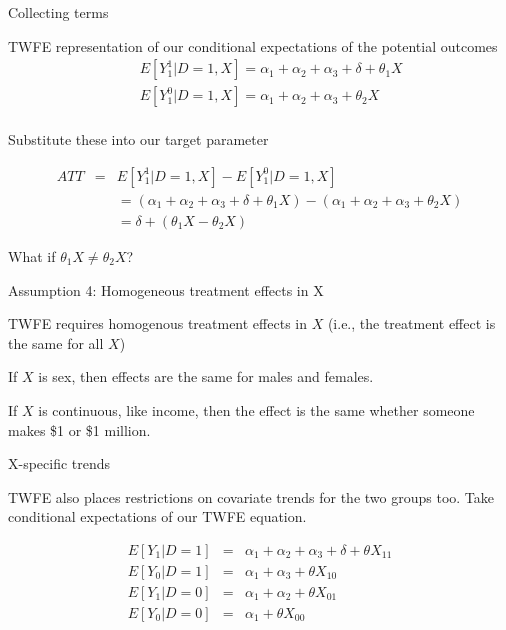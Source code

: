 \documentclass{beamer}
\begin{document}
\begin{frame}{Collecting terms}

TWFE representation of our conditional expectations of the potential outcomes
\begin{eqnarray*}
&&E[Y^1_1|D=1,X] = \alpha_1 + \alpha_2 + \alpha_3 + \delta + \theta_1 X \\
&&E[Y^0_{1}|D=1,X] = \alpha_1  + \alpha_2 + \alpha_3 + \theta_2 X \\
\end{eqnarray*}

Substitute these into our target parameter

\begin{eqnarray*}
ATT &=& E[Y^1_1|D=1,X]  - E[Y^0_{1}|D=1,X]   \\
&&=(\alpha_1 + \alpha_2 + \alpha_3 + \delta + \theta_1 X) - ( \alpha_1  + \alpha_2 + \alpha_3 + \theta_2 X )\\
&&=\delta + (\theta_1 X - \theta_2 X)
\end{eqnarray*}

\bigskip

What if $\theta_1 X \neq \theta_2 X$?

\end{frame}

\begin{frame}{Assumption 4: Homogeneous treatment effects in X}


TWFE requires homogenous treatment effects in $X$ (i.e., the treatment effect is the same for all $X$)

\bigskip

If $X$ is sex, then effects are the same for males and females.

\bigskip

  If $X$ is continuous, like income, then the effect is the same whether someone makes \$1 or \$1 million.

\end{frame}

\begin{frame}{X-specific trends}

TWFE also places restrictions on covariate trends for the two groups too.  Take conditional expectations of our TWFE equation. 

\begin{eqnarray*}
E[Y_1|D=1] &=& \alpha_1 + \alpha_2 + \alpha_3 + \delta + \theta X_{11} \\
E[Y_0|D=1] &=& \alpha_1 + \alpha_3 + \theta X_{10} \\
E[Y_1|D=0] &=& \alpha_1 + \alpha_2 + \theta X_{01} \\
E[Y_0|D=0] &=& \alpha_1 + \theta X_{00}
\end{eqnarray*}


\end{frame}
\end{document}
